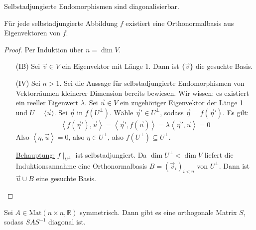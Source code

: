 \documentclass{report}
\newcommand*{\newpar}{\par\vspace{\baselineskip}\noindent}
\newcommand{\ul}[1]{\underline{#1}}
\newcommand{\bR}{\mathbb{R}}
\renewcommand{\vu}{\vec{u}}
\newcommand{\vv}{\vec{v}}
\newcommand{\veta}{\vec{\eta}}
\newcommand{\scalar}[2]{\left\langle #1, #2 \right\rangle}
\begin{document}
\begin{corollary}
 Selbstadjungierte Endomorphismen sind diagonalisierbar.
\end{corollary}
\begin{theorem}
 Für jede selbstadjungierte Abbildung $f$ existiert eine Orthonormalbasis aus Eigenvektoren von $f$.
\end{theorem}
\begin{proof}
 Per Induktion über $n = \dim V$.
 \begin{enumerate}
  \item[(IB)] Sei $\vv \in V$ ein Eigenvektor mit Länge $1$. Dann ist $\{\vv\}$ die gesuchte Basis.
  \item[(IV)] Sei $n > 1$. Sei die Aussage für selbstadjungierte Endomorphismen von Vektorräumen kleinerer Dimension bereits bewiesen. Wir wissen: es existiert ein reeller Eigenwert $\lambda$. Sei $\vu \in V$ ein zugehöriger Eigenvektor der Länge 1 und $U = \langle \vu \rangle$. Sei $\veta$ in $f(U^\bot)$. Wähle $\veta' \in U^\bot$, sodass $\veta = f(\veta')$.  Es gilt:
  \begin{align*}
   \scalar{f(\veta')}{\vu} = \scalar{\veta'}{f(\vu)} = \lambda\scalar{\veta'}{\vu} = 0
  \end{align*}
  Also $\scalar{\eta}{\vu} = 0$, also $\eta \in U^\bot$, also $f(U^\bot) \subseteq U^\bot$.
  \newpar
  \ul{Behauptung:} $f \mid_{U^\bot}$ ist selbstadjungiert. Da $\dim U^\bot < \dim V$ liefert die Induktionsannahme eine Orthonormalbasis $B = (\vv_i)_{i < n}$ von $U^\bot$. Dann ist $\vu \cup B$ eine gesuchte Basis.
 \end{enumerate}
\end{proof}
\begin{proposition}
 Sei $A \in \text{Mat}(n \times n, \bR)$ symmetrisch. Dann gibt es eine orthogonale Matrix $S$, sodass $SAS^{-1}$ diagonal ist.
\end{proposition}
\end{document}
